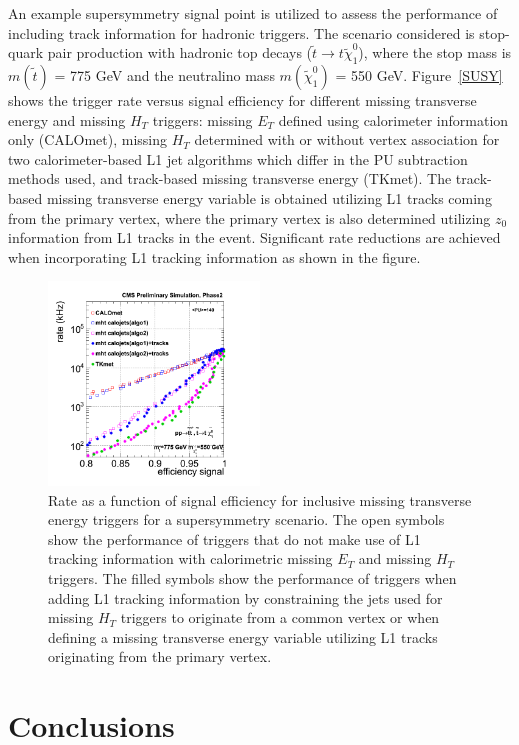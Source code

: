\documentclass{PoS}
\begin{document}
An example supersymmetry signal point is utilized to assess the performance of including track information for hadronic triggers. The scenario 
considered is stop-quark pair production with hadronic top decays ($\tilde{t}\rightarrow t\tilde{\chi}^0_1$), where the stop mass is $m(\tilde{t})$ 
= 775 GeV and the neutralino mass $m(\tilde{\chi}^0_1)$ = 550 GeV. Figure~\ref{SUSY} shows the trigger rate versus signal efficiency for different missing
transverse energy and missing $H_T$ triggers: missing $E_T$ defined using calorimeter information only (CALOmet), missing $H_T$ determined 
with or without vertex association for two calorimeter-based L1 jet algorithms which differ in the PU subtraction methods used, and track-based 
missing transverse energy (TKmet). The track-based missing transverse energy variable is obtained utilizing L1 tracks coming from the primary 
vertex, where the primary vertex is also determined utilizing $z_0$ information from L1 tracks in the event. Significant rate reductions are achieved when incorporating L1 tracking information as shown in the figure.
\begin{figure}[h!]
  \centering
	\includegraphics[width=0.5\textwidth]{Figures/roc_MHT_T2tt_775_550.png}
	\caption{Rate as a function of signal efficiency for inclusive missing transverse energy triggers for a supersymmetry scenario. The open symbols show the performance of triggers that do not make use of L1 tracking information with calorimetric missing $E_T$ and missing $H_T$ triggers. The filled symbols show the performance of triggers when adding L1 tracking information by constraining the jets used for missing $H_T$ triggers to originate from a common vertex or when defining a missing transverse energy variable utilizing L1 tracks originating from the primary vertex.}
	\label{fig:SUSY}
\end{figure}

\section{Conclusions}
\end{document}
